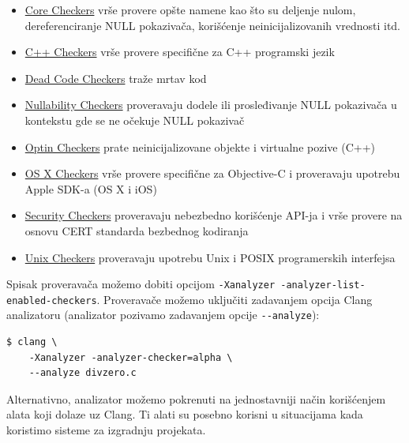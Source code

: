 \begin{itemize}
\tightlist
\item
  \href{https://clang-analyzer.llvm.org/available_checks.html\#core_checkers}{Core Checkers} vrše provere opšte namene kao što su deljenje nulom, dereferenciranje NULL pokazivača, korišćenje neinicijalizovanih vrednosti itd.
\item
  \href{https://clang-analyzer.llvm.org/available_checks.html\#cplusplus_checkers}{C++ Checkers} vrše provere specifične za C++ programski jezik
\item
  \href{https://clang-analyzer.llvm.org/available_checks.html\#deadcode_checkers}{Dead Code Checkers} traže mrtav kod
\item
  \href{https://clang-analyzer.llvm.org/available_checks.html\#nullability_checkers}{Nullability Checkers} proveravaju dodele ili prosleđivanje NULL pokazivača u kontekstu gde se ne očekuje NULL pokazivač
\item
  \href{https://clang-analyzer.llvm.org/available_checks.html\#optin_checkers}{Optin Checkers} prate neinicijalizovane objekte i virtualne pozive (C++)
\item
  \href{https://clang-analyzer.llvm.org/available_checks.html\#osx_checkers}{OS X Checkers} vrše provere specifične za Objective-C i proveravaju upotrebu Apple SDK-a (OS X i iOS)
\item
  \href{https://clang-analyzer.llvm.org/available_checks.html\#security_checkers}{Security Checkers} proveravaju nebezbedno korišćenje API-ja i vrše provere na osnovu CERT standarda bezbednog kodiranja
\item
  \href{https://clang-analyzer.llvm.org/available_checks.html\#unix_checkers}{Unix Checkers} proveravaju upotrebu Unix i POSIX programerskih interfejsa
\end{itemize}

Spisak proveravača možemo dobiti opcijom \texttt{-Xanalyzer\ -analyzer-list-enabled-checkers}. Proveravače možemo uključiti zadavanjem opcija Clang analizatoru (analizator pozivamo zadavanjem opcije \texttt{-\/-analyze}):

\begin{verbatim}
$ clang \
    -Xanalyzer -analyzer-checker=alpha \
    --analyze divzero.c
\end{verbatim}

Alternativno, analizator možemo pokrenuti na jednostavniji način korišćenjem alata koji dolaze uz Clang. Ti alati su posebno korisni u situacijama kada koristimo sisteme za izgradnju projekata.

